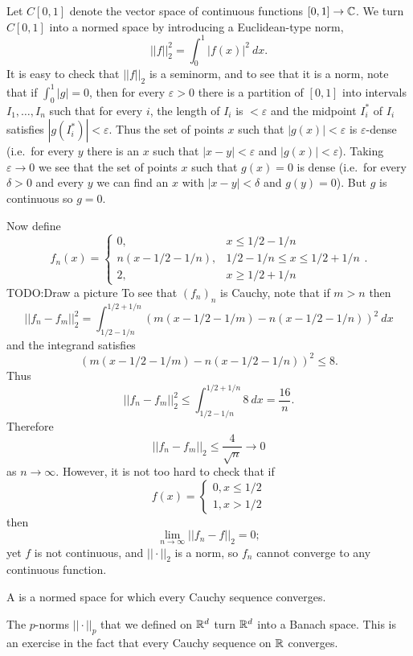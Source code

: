 \begin{example}
Let $C[0, 1]$ denote the vector space of continuous functions $[0, 1] \to \mathbb{C}$.
We turn $C[0, 1]$ into a normed space by introducing a Euclidean-type norm,
\[||f||_{2}^{2} = \int_{0}^{1} |f(x)|^{2} ~dx.\]
It is easy to check that $||f||_{2}$ is a seminorm, and to see that it is a norm, note that if $\int_{0}^{1} |g| = 0$, then for every $\varepsilon > 0$ there is a partition of $[0, 1]$ into intervals $I_{1}, \dots, I_{n}$ such that for every $i$, the length of $I_{i}$ is $<\varepsilon$ and the midpoint $I_{i}^{*}$ of $I_{i}$ satisfies $|g(I_{i}^{*})| < \varepsilon$.
Thus the set of points $x$ such that $|g(x)| < \varepsilon$ is $\varepsilon$-dense (i.e.\ for every $y$ there is an $x$ such that $|x - y| < \varepsilon$ and $|g(x)| < \varepsilon$).
Taking $\varepsilon \to 0$ we see that the set of points $x$ such that $g(x) = 0$ is dense (i.e.\ for every $\delta > 0$ and every $y$ we can find an $x$ with $|x - y| < \delta$ and $g(y) = 0$).
But $g$ is continuous so $g = 0$.

Now define
\[f_{n}(x) = \begin{cases}
0, &x \leq 1/2 - 1/n\\
n(x - 1/2 - 1/n), &1/2 - 1/n \leq x \leq 1/2 + 1/n\\
2, &x \geq 1/2 + 1/n
\end{cases}.\]
TODO:\@ Draw a picture
To see that ${(f_{n})}_{n}$ is Cauchy, note that if $m > n$ then
\[||f_{n} - f_{m}||_{2}^{2} = \int_{1/2-1/n}^{1/2+1/n} {(m(x - 1/2 - 1/m) - n(x - 1/2 - 1/n))}^{2}~dx\]
and the integrand satisfies
\[{(m(x - 1/2 - 1/m) - n(x - 1/2 - 1/n))}^{2} \leq 8.\]
Thus
\[||f_{n} - f_{m}||_{2}^{2} \leq \int_{1/2-1/n}^{1/2+1/n} 8~dx = \frac{16}{n}.\]
Therefore
\[||f_{n} - f_{m}||_{2} \leq \frac{4}{\sqrt n} \to 0\]
as $n \to \infty$. However, it is not too hard to check that if
\[f(x) = \begin{cases}
0, x \leq 1/2\\
1, x > 1/2
\end{cases}\]
then
\[\lim_{n \to \infty} ||f_{n} - f||_{2} = 0;\]
yet $f$ is not continuous, and $||\cdot||_{2}$ is a norm, so $f_{n}$ cannot converge to any continuous function.
\end{example}

\begin{definition}
A  is a normed space for which every Cauchy sequence converges.
\end{definition}

\begin{example}
The $p$-norms $||\cdot||_{p} $ that we defined on $\mathbb{R}^{d}$ turn $\mathbb{R}^{d}$ into a Banach space.
This is an exercise in the fact that every Cauchy sequence on $\mathbb{R}$ converges.
\end{example}

